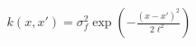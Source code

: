 \documentclass[preview]{standalone}
\begin{document}
\begin{align*}
k(x, x') = \sigma_f^2 \exp\left(-\frac{(x - x')^2}{2\ell^2}\right)
\end{align*}
\end{document}
